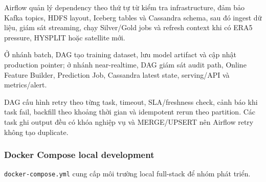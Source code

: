 \documentclass[12pt,a4paper]{article}
\begin{document}
Airflow quản lý dependency theo thứ tự từ kiểm tra infrastructure, đảm bảo Kafka topics, HDFS layout, Iceberg tables và Cassandra schema, sau đó ingest dữ liệu, giám sát streaming, chạy Silver/Gold jobs và refresh context khi có ERA5 pressure, HYSPLIT hoặc satellite mới. 

Ở nhánh batch, DAG tạo training dataset, lưu model artifact và cập nhật production pointer; ở nhánh near-realtime, DAG giám sát audit path, Online Feature Builder, Prediction Job, Cassandra latest state, serving/API và metrics/alert.

DAG cấu hình retry theo từng task, timeout, SLA/freshness check, cảnh báo khi task fail, backfill theo khoảng thời gian và idempotent rerun theo partition. Các task ghi output đều có khóa nghiệp vụ và MERGE/UPSERT nên Airflow retry không tạo duplicate.

\subsubsection{Docker Compose local development}\label{docker-compose-local-development}

\texttt{docker-compose.yml} cung cấp môi trường local full-stack để nhóm phát triển.
\end{document}
